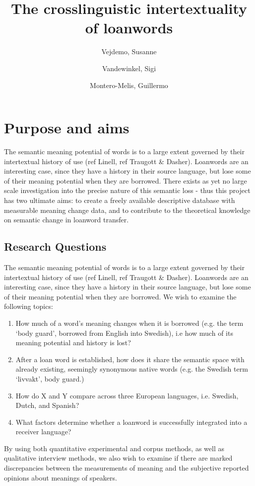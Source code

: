\documentclass[a4paper]{article}
\title{The crosslinguistic intertextuality of loanwords}
\author{Vejdemo, Susanne \and Vandewinkel, Sigi \and Montero-Melis, Guillermo}
\begin{document}
\maketitle
\thispagestyle{fancy} %

\section{Purpose and aims}
The semantic meaning potential of words is to a large extent governed by their intertextual history of use (ref Linell, ref Traugott \& Dasher).
Loanwords are an interesting case, since they have a history in their source language, but lose some of their meaning potential when they are borrowed.
There exists as yet no large scale investigation into the precise nature of this semantic loss - thus this project has two ultimate aims: to create a freely available descriptive database with measurable meaning change data, and to contribute to the theoretical knowledge on semantic change in loanword transfer.

\subsection{Research Questions}
The semantic meaning potential of words is to a large extent governed by their intertextual history of use (ref Linell, ref Traugott \& Dasher).
Loanwords are an interesting case, since they have a history in their source language, but lose some of their meaning potential when they are borrowed.
We wish to examine the following topics:
%
\begin{enumerate}
	\item  How much of a word's meaning changes when it is borrowed (e.g. the term `body guard', borrowed from English into Swedish), i.e how much of its meaning potential and history is lost?
	\item  After a loan word is established, how does it share the semantic space with already existing, seemingly synonymous native words (e.g. the Swedish term `livvakt', body guard.)
	\item How do X and Y compare across three European languages, i.e. Swedish, Dutch, and Spanish?
	\item What factors determine whether a loanword is successfully integrated into a receiver language?
\end{enumerate}
%
By using both quantitative experimental and corpus methods, as well as qualitative interview methods, we also wish to examine if there are marked discrepancies between the measurements of meaning and the subjective reported opinions about meanings of speakers.
\end{document}
